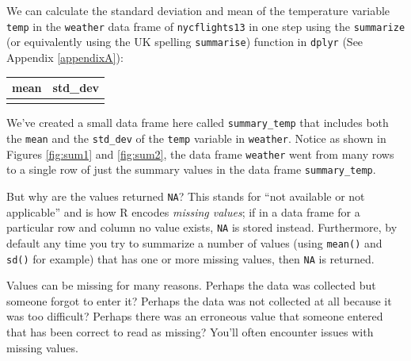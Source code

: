 \documentclass[12pt,]{krantz}
\makeatletter
\newenvironment{Shaded}{\begin{snugshade}}{\end{snugshade}}
\newcommand{\KeywordTok}[1]{\textcolor[rgb]{0.27,0.27,0.27}{\textbf{#1}}}
\newcommand{\DataTypeTok}[1]{\textcolor[rgb]{0.27,0.27,0.27}{#1}}
\newcommand{\StringTok}[1]{\textcolor[rgb]{0.5,0.5,0.5}{#1}}
\newcommand{\OperatorTok}[1]{\textcolor[rgb]{0.43,0.43,0.43}{\textbf{#1}}}
\newcommand{\NormalTok}[1]{#1}
\newenvironment{kframe}{%
\medskip{}
\setlength{\fboxsep}{.8em}
 \def\at@end@of@kframe{}%
 \ifinner\ifhmode%
  \def\at@end@of@kframe{\end{minipage}}%
  \begin{minipage}{\columnwidth}%
 \fi\fi%
 \def\FrameCommand##1{\hskip\@totalleftmargin \hskip-\fboxsep
 \colorbox{shadecolor}{##1}\hskip-\fboxsep
     \hskip-\linewidth \hskip-\@totalleftmargin \hskip\columnwidth}%
 \MakeFramed {\advance\hsize-\width
   \@totalleftmargin\z@ \linewidth\hsize
   \@setminipage}}%
 {\par\unskip\endMakeFramed%
 \at@end@of@kframe}
\renewenvironment{Shaded}{\begin{kframe}}{\end{kframe}}
\theoremstyle{definition}
\theoremstyle{definition}
\theoremstyle{definition}
\theoremstyle{remark}
\makeatother
\begin{document}
We can calculate the standard deviation and mean of the temperature
variable \texttt{temp} in the \texttt{weather} data frame of
\texttt{nycflights13} in one step using the \texttt{summarize} (or
equivalently using the UK spelling \texttt{summarise}) function in
\texttt{dplyr} (See Appendix \ref{appendixA}):

\begin{Shaded}
\end{Shaded}

\begin{table}[H]
\centering\begingroup\fontsize{10}{12}\selectfont

\begin{tabular}{r|r}
\hline
mean & std\_dev\\
\hline
 & \\
\hline
\end{tabular}\endgroup{}
\end{table}

We've created a small data frame here called \texttt{summary\_temp} that
includes both the \texttt{mean} and the \texttt{std\_dev} of the
\texttt{temp} variable in \texttt{weather}. Notice as shown in Figures
\ref{fig:sum1} and \ref{fig:sum2}, the data frame \texttt{weather} went
from many rows to a single row of just the summary values in the data
frame \texttt{summary\_temp}.

But why are the values returned \texttt{NA}? This stands for ``not
available or not applicable'' and is how R encodes \emph{missing
values}; if in a data frame for a particular row and column no value
exists, \texttt{NA} is stored instead. Furthermore, by default any time
you try to summarize a number of values (using \texttt{mean()} and
\texttt{sd()} for example) that has one or more missing values, then
\texttt{NA} is returned.

Values can be missing for many reasons. Perhaps the data was collected
but someone forgot to enter it? Perhaps the data was not collected at
all because it was too difficult? Perhaps there was an erroneous value
that someone entered that has been correct to read as missing? You'll
often encounter issues with missing values.
\end{document}
